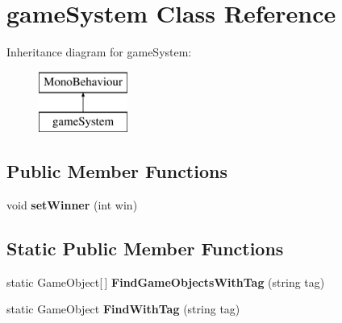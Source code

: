 \hypertarget{classgame_system}{}\section{game\+System Class Reference}
\label{classgame_system}
Inheritance diagram for game\+System\+:\begin{figure}[H]
\begin{center}
\leavevmode
\includegraphics[height=2.000000cm]{classgame_system}
\end{center}
\end{figure}
\subsection*{Public Member Functions}
\begin{DoxyCompactItemize}
\item 
void {\bfseries set\+Winner} (int win)\hypertarget{classgame_system_a1a4828b46a992e71baf24612cd3ee589}{}\label{classgame_system_a1a4828b46a992e71baf24612cd3ee589}

\end{DoxyCompactItemize}
\subsection*{Static Public Member Functions}
\begin{DoxyCompactItemize}
\item 
static Game\+Object\mbox{[}$\,$\mbox{]} {\bfseries Find\+Game\+Objects\+With\+Tag} (string tag)\hypertarget{classgame_system_aaa3783c37d97151c299f7c4280729f43}{}\label{classgame_system_aaa3783c37d97151c299f7c4280729f43}

\item 
static Game\+Object {\bfseries Find\+With\+Tag} (string tag)\hypertarget{classgame_system_a2cd294b644b6e244cee6eb151a25e4bc}{}\label{classgame_system_a2cd294b644b6e244cee6eb151a25e4bc}

\end{DoxyCompactItemize}
